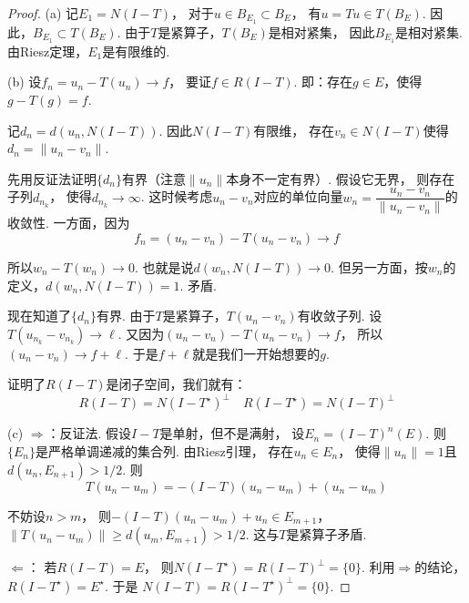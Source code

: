 \begin{proof}
    
    (a) 记$E_1 = N(I-T)$，
    对于$u \in B_{E_1} \subset B_E$，
    有$u = Tu \in T(B_E)$.
    因此，$B_{E_1} \subset T(B_E)$.
    由于$T$是紧算子，$T(B_E)$是相对紧集，
    因此$B_{E_1}$是相对紧集.
    由Riesz定理，$E_1$是有限维的.

    \medskip

    (b) 设$f_n = u_n - T(u_n) \to f$，
    要证$f \in R(I-T)$.
    即：存在$g \in E$，使得$g - T(g) = f$.

    记$d_n = d(u_n , N(I-T))$.
    因此$N(I-T)$有限维，
    存在$v_n \in N(I-T)$使得$d_n = \|u_n - v_n\|$.

    先用反证法证明$\{d_n\}$有界（注意$\|u_n\|$本身不一定有界）.
    假设它无界，
    则存在子列$d_{n_k}$，
    使得$d_{n_k} \to \infty$.
    这时候考虑$u_n - v_n$对应的单位向量$w_n = \dfrac{u_n - v_n}{\|u_n - v_n\|}$的收敛性.
    一方面，因为
    \[
    f_n = (u_n - v_n) - T(u_n - v_n) \to f
    \]

    所以$w_n - T(w_n) \to 0$.
    也就是说$d (w_n , N(I-T)) \to 0$.
    但另一方面，按$w_n$的定义，$d (w_n , N(I-T)) = 1$. 矛盾.

    现在知道了$\{d_n\}$有界.
    由于$T$是紧算子，$T(u_n - v_n)$有收敛子列.
    设$T(u_{n_k} - v_{n_k}) \to \ell$.
    又因为$(u_n - v_n) - T(u_n - v_n) \to f$，
    所以$(u_n - v_n) \to f+\ell$. 于是$f + \ell$就是我们一开始想要的$g$.

    证明了$R(I-T)$是闭子空间，我们就有：
    \[
    R(I-T) = N(I-T^\star)^\perp \quad R(I-T^\star) = N(I - T)^\perp
    \]

    \medskip

    (c) $\Rightarrow$：反证法.
    假设$I-T$是单射，但不是满射，
    设$E_n = (I-T)^n (E)$.
    则$\{E_n\}$是严格单调递减的集合列.
    由Riesz引理，
    存在$u_n \in E_n$，
    使得$\|u_n\| = 1$且$d(u_n, E_{n+1}) > 1/2$.
    则
    \[
    T (u_n - u_m) = -(I-T) (u_n - u_m) + (u_n - u_m) 
    \]

    不妨设$n> m$，
    则$-(I-T) (u_n - u_m) + u_n \in E_{m+1}$，
    $\| T (u_n - u_m)\| \ge d (u_m , E_{m+1}) > 1/2$.
    这与$T$是紧算子矛盾.

    $\Leftarrow$：
    若$R(I-T) = E$，
    则$N(I-T^\star) = R(I-T)^\perp = \{0\}$.
    利用$\Rightarrow$的结论，
    $R(I-T^\star) = E^\star$.
    于是
    $N(I-T) = R(I-T^\star)^\perp = \{0\}$.
\end{proof}



